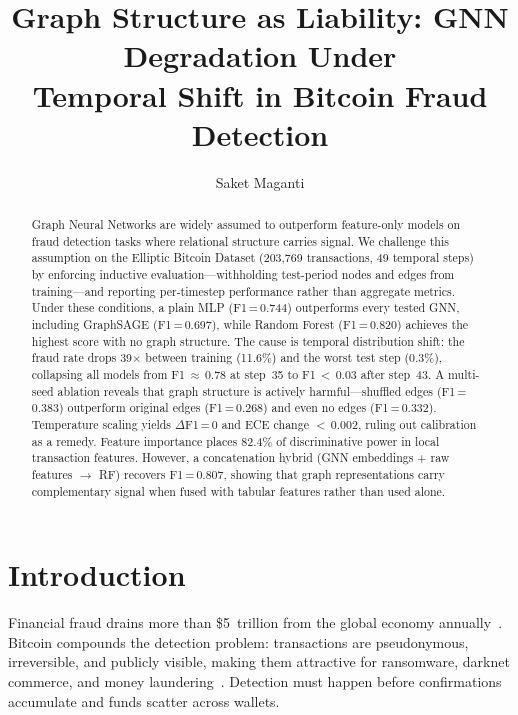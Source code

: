 \documentclass[11pt]{article}
\title{Graph Structure as Liability: GNN Degradation Under\\
       Temporal Shift in Bitcoin Fraud Detection}
\author{Saket Maganti}
\date{}
\begin{document}
\maketitle

\begin{abstract}
Graph Neural Networks are widely assumed to outperform feature-only
models on fraud detection tasks where relational structure carries
signal.  We challenge this assumption on the Elliptic Bitcoin Dataset
(203,769 transactions, 49 temporal steps) by enforcing inductive
evaluation---withholding test-period nodes and edges from
training---and reporting per-timestep performance rather than
aggregate metrics.  Under these conditions, a plain MLP
(F1\,=\,0.744) outperforms every tested GNN, including GraphSAGE
(F1\,=\,0.697), while Random Forest (F1\,=\,0.820) achieves the
highest score with no graph structure.  The cause is temporal
distribution shift: the fraud rate drops 39$\times$ between training
(11.6\%) and the worst test step (0.3\%), collapsing all models from
F1\,$\approx$\,0.78 at step~35 to F1\,$<$\,0.03 after step~43.  A
multi-seed ablation reveals that graph structure is actively
harmful---shuffled edges (F1\,=\,0.383) outperform original edges
(F1\,=\,0.268) and even no edges (F1\,=\,0.332).  Temperature
scaling yields $\Delta$F1\,=\,0 and ECE change $<$\,0.002, ruling
out calibration as a remedy.  Feature importance places 82.4\% of
discriminative power in local transaction features.  However, a
concatenation hybrid (GNN embeddings + raw features $\to$ RF)
recovers F1\,=\,0.807, showing that graph representations carry
complementary signal when fused with tabular features rather than
used alone.
\end{abstract}

\section{Introduction}
\label{sec:intro}

Financial fraud drains more than \$5~trillion from the global economy
annually~\citep{crowe2020}.  Bitcoin compounds the detection problem:
transactions are pseudonymous, irreversible, and publicly visible,
making them attractive for ransomware, darknet commerce, and money
laundering~\citep{meiklejohn2013bitcoin}.  Detection must happen
before confirmations accumulate and funds scatter across wallets.
\end{document}
